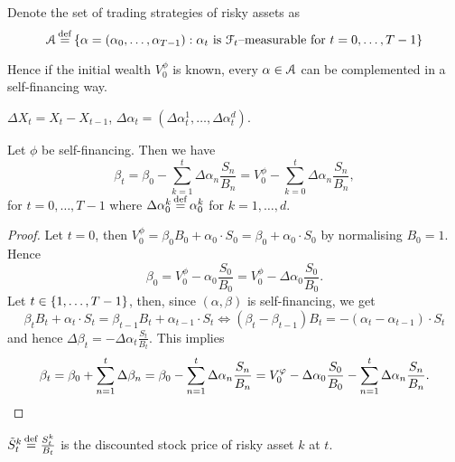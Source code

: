 \documentclass[12pt]{amsart}
\begin{document}
Denote the set of trading strategies of risky assets as \[
    \cA \defn \set{\alpha = (\alpha_0, \dots, \alpha_{T-1}) : \alpha_t \text{ is } \cF_t\text{--measurable for } t=0, \dots, T-1}
\]

Hence if the initial wealth \(V_0^\phi\) is known, every \(\alpha \in \cA\) can be complemented in a self-financing way.

\begin{remark}[Notation]
    \(\Delta X_t = X_t - X_{t-1}\), \(\Delta \alpha_t = (\Delta \alpha_t^1, \dots, \Delta \alpha_t^d)\).
\end{remark}

\begin{lemma}\label{le:SELFF_TO_BETA}
    Let \(\phi\) be self-financing. Then we have \[
        \beta_t = \beta_0 - \sum_{k=1}^t \Delta \alpha_n \frac{S_n}{B_n} = V_0^\phi - \sum_{k=0}^t \Delta \alpha_n \frac{S_n}{B_n},
    \]
    for \(t=0, \dots, T-1\) where \(\Delta \alpha_0^k \defn \alpha_0^k\) for \(k=1, \dots, d\).
\end{lemma}
\begin{proof}
    Let \(t=0\), then \(V_0^\phi = \beta_0 B_0 + \alpha_0 \cdot S_0 = \beta_0 + \alpha_0 \cdot S_0\) by normalising \(B_0 = 1\). Hence \[
        \beta_0 = V_0^\phi - \alpha_0 \frac{S_0}{B_0} = V_0^\phi - \Delta \alpha_0 \frac{S_0}{B_0}.
    \]
    Let \(t \in \set{1, \dots, T-1}\), then, since \((\alpha, \beta)\) is self-financing, we get \[
        \beta_t B_t + \alpha_t \cdot S_t = \beta_{t-1} B_t + \alpha_{t-1} \cdot S_t \iff (\beta_t-\beta_{t-1}) B_t = -(\alpha_t - \alpha_{t-1}) \cdot S_t
    \]
    and hence \(\Delta \beta_t = - \Delta \alpha_t \frac{S_t}{B_t}\).
    This implies \[
        \beta_t = \beta_0 + \sum_{n=1}^t \Delta \beta_n = \beta_0 - \sum_{n=1}^t \Delta \alpha_n \frac{S_n}{B_n} = V_0^\phi - \Delta \alpha_0 \frac{S_0}{B_0} - \sum_{n=1}^t \Delta \alpha_n \frac{S_n}{B_n}.\qedhere
    \]
\end{proof}

\begin{definition}
    \(\tilde{S}_t^k \defn \frac{S_t^k}{B_t}\) is the discounted stock price of risky asset \(k\) at \(t\).
\end{definition}
\end{document}
